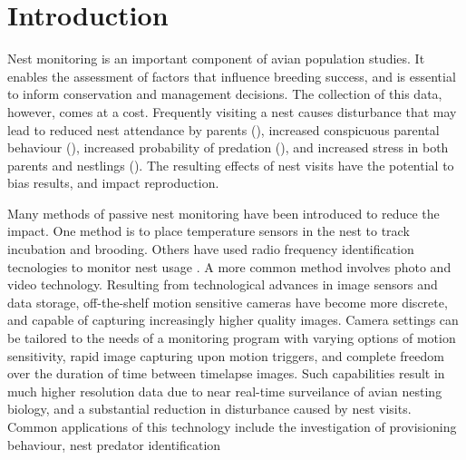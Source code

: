 \section{Introduction}



Nest monitoring is an important component of avian population studies.
It enables the assessment of factors that influence breeding success, and is essential to inform conservation and management decisions.
The collection of this data, however, comes at a cost.
Frequently visiting a nest causes disturbance that may lead to reduced nest attendance by parents (), increased conspicuous parental behaviour (), increased probability of predation (), and increased stress in both parents and nestlings ().
The resulting effects of nest visits have the potential to bias results, and impact reproduction.

 
 
 
 
Many methods of passive nest monitoring have been introduced to reduce the impact.
One method is to place temperature sensors in the nest to track incubation and brooding.
Others have used radio frequency identification tecnologies to monitor nest usage \cite{alba2019ZB}.
A more common method involves photo and video technology.
Resulting from technological advances in image sensors and data storage, off-the-shelf motion sensitive cameras have become more discrete, and capable of capturing increasingly higher quality images.
Camera settings can be tailored to the needs of a monitoring program with varying options of motion sensitivity, rapid image capturing upon motion triggers, and complete freedom over the duration of time between timelapse images. 
Such capabilities result in much higher resolution data due to near real-time surveilance of avian nesting biology, and a substantial reduction in disturbance caused by nest visits.
Common applications of this technology include the investigation of provisioning behaviour, nest predator identification \cite{cox2012LE,degregorio2014EE}

